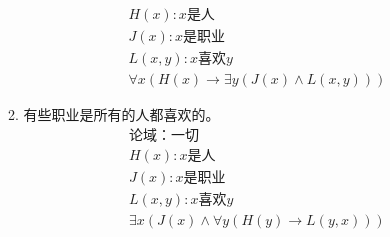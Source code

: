 \documentclass[UTF8]{ctexart}
\begin{document}
\begin{enumerate}
\begin{enumerate}
\[\begin{aligned}
                   &H(x):\text{$x$是人}\\
                   &J(x):\text{$x$是职业}\\
                   &L(x,y):\text{$x$喜欢$y$}\\
                   &\forall x(H(x)\rightarrow \exists y(J(x)\wedge L(x,y)))
               \end{aligned}
           \]
           \item 有些职业是所有的人都喜欢的。
           \[
                \begin{aligned}
                    &\text{论域：一切}\\
                    &H(x):\text{$x$是人}\\
                    &J(x):\text{$x$是职业}\\
                    &L(x,y):\text{$x$喜欢$y$}\\
                    &\exists x(J(x)\wedge \forall y(H(y)\rightarrow L(y,x)))
                \end{aligned}
            \]
       \end{enumerate}


\end{enumerate}
\end{document}
